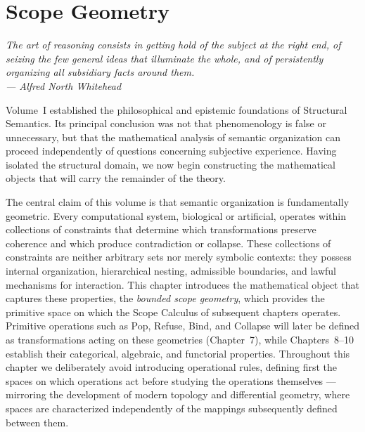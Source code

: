 \documentclass[11pt,twoside,openright]{book}
\numberwithin{equation}{chapter}
\theoremstyle{definition}
\theoremstyle{plain}
\theoremstyle{remark}
\theoremstyle{definition}
\begin{document}
\chapter{Scope Geometry}
\label{ch:scope-geometry}

\vspace{1em}
\begin{flushright}\itshape
The art of reasoning consists in getting hold of the subject at the right
end, of seizing the few general ideas that illuminate the whole, and of
persistently organizing all subsidiary facts around them.\\
\upshape --- Alfred North Whitehead
\end{flushright}
\vspace{1em}

Volume~I established the philosophical and epistemic foundations of
Structural Semantics. Its principal conclusion was not that phenomenology
is false or unnecessary, but that the mathematical analysis of semantic
organization can proceed independently of questions concerning subjective
experience. Having isolated the structural domain, we now begin
constructing the mathematical objects that will carry the remainder of
the theory.

The central claim of this volume is that semantic organization is
fundamentally geometric. Every computational system, biological or
artificial, operates within collections of constraints that determine
which transformations preserve coherence and which produce contradiction
or collapse. These collections of constraints are neither arbitrary sets
nor merely symbolic contexts: they possess internal organization,
hierarchical nesting, admissible boundaries, and lawful mechanisms for
interaction. This chapter introduces the mathematical object that
captures these properties, the \emph{bounded scope geometry}, which
provides the primitive space on which the Scope Calculus of subsequent
chapters operates. Primitive operations such as Pop, Refuse, Bind, and
Collapse will later be defined as transformations acting on these
geometries (Chapter~7), while Chapters~8--10 establish their categorical,
algebraic, and functorial properties. Throughout this chapter we
deliberately avoid introducing operational rules, defining first the
spaces on which operations act before studying the operations themselves
--- mirroring the development of modern topology and differential
geometry, where spaces are characterized independently of the mappings
subsequently defined between them.
\end{document}
